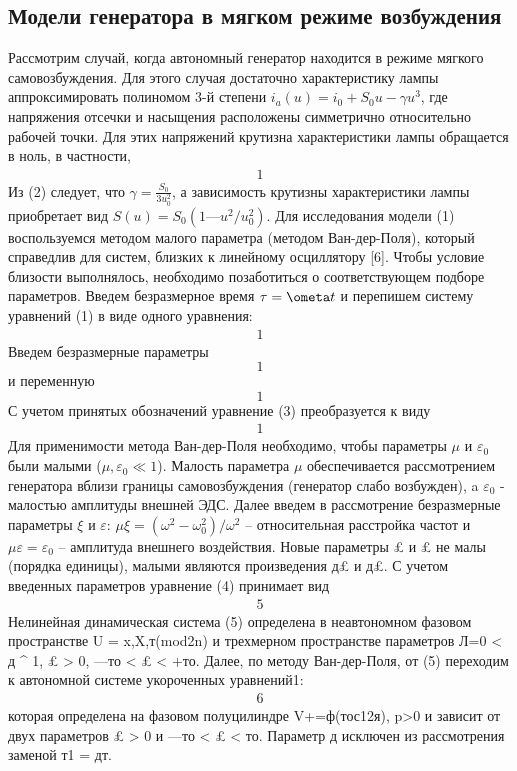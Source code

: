 \documentclass[a4paper,14pt]{extarticle}
\begin{document}
\subsection{Модели генератора в мягком режиме возбуждения}
Рассмотрим случай, когда автономный генератор находится в режиме мягкого самовозбуждения. Для этого случая достаточно характеристику лампы аппроксимировать полиномом 3-й степени $i_a(u) = i_0 + S_0u - \gamma u^3$, где напряжения отсечки и насыщения расположены симметрично относительно рабочей точки. Для этих напряжений крутизна характеристики лампы обращается в ноль, в частности,
\begin{gather}
  \label{eq2}
  1
\end{gather}
Из (2) следует, что $\gamma=\frac{S_0}{3u_0^2}$, а зависимость крутизны характеристики лампы приобретает вид $S(u) = S_0(1 — u^2/u_0^2)$.
Для исследования модели (1) воспользуемся методом малого параметра (методом Ван-дер-Поля), который справедлив для систем, близких к линейному осциллятору [6]. Чтобы условие близости выполнялось, необходимо позаботиться о соответствующем подборе параметров. Введем безразмерное время $\tau=\ometa t$ и перепишем систему уравнений (1) в виде одного уравнения:
\begin{gather}
  \label{eq3}
  1
\end{gather}
Введем безразмерные параметры
\begin{equation}
  1
\end{equation}
и переменную
\begin{equation}
  1
\end{equation}
С учетом принятых обозначений уравнение (3) преобразуется к виду
\begin{gather}
  \label{eq4}
  1
\end{gather}
Для применимости метода Ван-дер-Поля необходимо, чтобы параметры $\mu$ и $\varepsilon_0$ были малыми ($\mu, \varepsilon_0 \ll 1$). Малость параметра $\mu$ обеспечивается рассмотрением генератора вблизи границы самовозбуждения (генератор слабо возбужден), a $\varepsilon_0$ - малостью амплитуды внешней ЭДС. Далее введем в рассмотрение безразмерные параметры $\xi$ и $\varepsilon$: $\mu\xi=(\omega^2-\omega_0^2)/\omega^2$ -- относительная расстройка частот и $\mu \varepsilon = \varepsilon_0$ -- амплитуда внешнего воздействия. Новые параметры £ и £ не малы (порядка единицы), малыми являются произведения д£ и д£. С учетом введенных параметров уравнение (4) принимает вид
\begin{gather}
  \label{eq5}
  5
\end{gather}
Нелинейная динамическая система (5) определена в неавтономном фазовом пространстве U = {x,X,т(mod2n)} и трехмерном пространстве параметров Л={0 < д ^ 1, £ > 0, —то < £ < +то}.
Далее, по методу Ван-дер-Поля, от (5) переходим к автономной системе укороченных уравнений1:
\begin{gather}
  \label{eq6}
  6
\end{gather}
которая определена на фазовом полуцилиндре V+={ф(тос12я), p>0} и зависит от двух параметров £ > 0 и —то < £ < то. Параметр д исключен из рассмотрения заменой т1 = дт.
\end{document}
